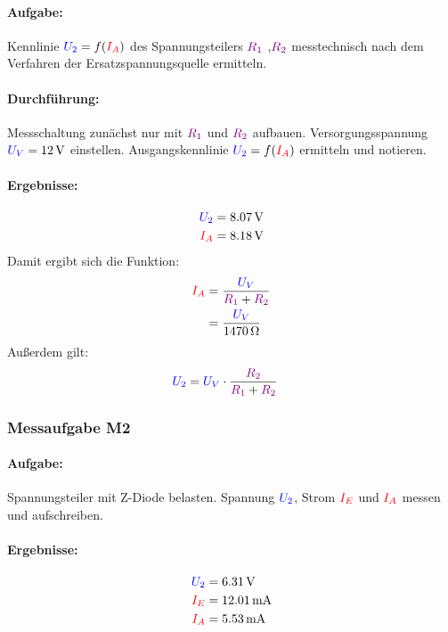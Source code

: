 \documentclass[a4paper,titlepage,parskip]{scrreprt}
\newcommand{\spannung}[1]{\textcolor{blue}{#1}}
\newcommand{\strom}[1]{\textcolor{red}{#1}}
\newcommand{\widerstand}[1]{\textcolor{violet}{#1}}
\begin{document}
                  \paragraph{Aufgabe:} Kennlinie $\spannung{U_2}= f(\strom{I_A})$ des Spannungsteilers $\widerstand{R_1}$ ,$\widerstand{R_2}$ messtechnisch nach dem Verfahren der Ersatzspannungsquelle ermitteln.
                  \paragraph{Durchführung:} Messschaltung zunächst nur mit $\widerstand{R_1}$ und $\widerstand{R_2}$ aufbauen. Versorgungsspannung
                  $\spannung{U_V} = \SI{12}{\volt}$ einstellen. Ausgangskennlinie $\spannung{U_2}= f(\strom{I_A})$ ermitteln und notieren.

                  \paragraph{Ergebnisse:}
                  \begin{align*}
                      \spannung{U_2} &= \SI{8,07}{\volt}\\
                      \strom{I_A} &= \SI{8,18}{\volt}
                  \end{align*}
                  Damit ergibt sich die Funktion:
                  \begin{align*}
                      \strom{I_A} &=\frac{\spannung{U_V}}{\widerstand{R_1} + \widerstand{R_2}}\\
                                     &=\frac{\spannung{U_V}}{\SI{1470}{\ohm}}
                  \end{align*}
                  Außerdem gilt:
                  \begin{align*}
                  	  \spannung{U_2} &=\spannung{U_V} \cdot \frac{\widerstand{R_2}}{\widerstand{R_1} + \widerstand{R_2}}
                  \end{align*}
              \subsubsection{Messaufgabe M2}
                  \paragraph{Aufgabe:}Spannungsteiler mit Z-Diode belasten. Spannung $\spannung{U_2}$, Strom $\strom{I_E}$ und $\strom{I_A}$ messen und aufschreiben.
                  \paragraph{Ergebnisse:}
                  \begin{align*}
                      \spannung{U_2} &= \SI{6,31}{\volt}\\
                          \strom{I_E} &= \SI{12,01}{\milli\ampere}\\
                          \strom{I_A} &= \SI{5,53}{\milli\ampere}
                  \end{align*}
\end{document}

